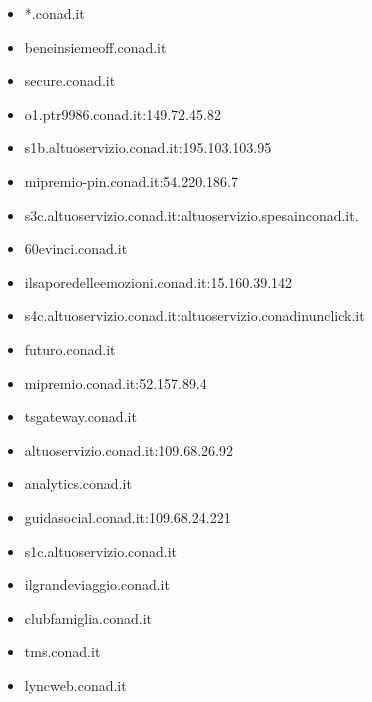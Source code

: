 \documentclass{article}
\begin{document}
\begin{itemize}
        \item *.conad.it
    
        \item beneinsiemeoff.conad.it
    
        \item secure.conad.it
    
        \item o1.ptr9986.conad.it:149.72.45.82
    
        \item s1b.altuoservizio.conad.it:195.103.103.95
    
        \item mipremio-pin.conad.it:54.220.186.7
    
        \item s3c.altuoservizio.conad.it:altuoservizio.spesainconad.it.
    
        \item 60evinci.conad.it
    
        \item ilsaporedelleemozioni.conad.it:15.160.39.142
    
        \item s4c.altuoservizio.conad.it:altuoservizio.conadinunclick.it
    
        \item futuro.conad.it
    
        \item mipremio.conad.it:52.157.89.4
    
        \item tsgateway.conad.it
    
        \item altuoservizio.conad.it:109.68.26.92
    
        \item analytics.conad.it
    
        \item guidasocial.conad.it:109.68.24.221
    
        \item s1c.altuoservizio.conad.it
    
        \item ilgrandeviaggio.conad.it
    
        \item clubfamiglia.conad.it
    
        \item tms.conad.it
    
        \item lyncweb.conad.it
    

\end{itemize}
\end{document}
